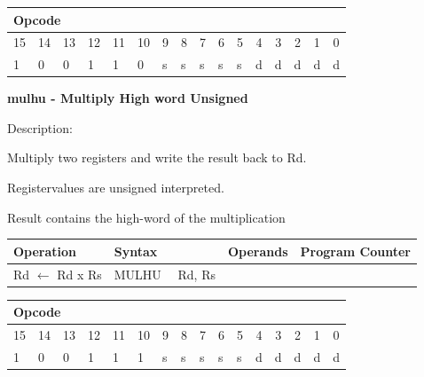 \documentclass[%
	pdftex,
	a4paper,
	oneside,
	bibtotoc,%
	idxtotoc,%
	bibtotocnumbered,
	halfparskip,%
]{scrbook}
\begin{document}
\begin{tabular}{|c|c|c|c|c|c|c|c|c|c|c|c|c|c|c|c|}
\hline
\multicolumn{6}{|l|}{Opcode} & \multicolumn{5}{|l|}{} & \multicolumn{5}{|l|}{
} \\ \hline
15 & 14 & 13 & 12 & 11 & 10 & 9 & 8 & 7 & 6 & 5 & 4 & 3 & 2 & 1 & 0 \\ \hline
\multicolumn{1}{|l|}{1} & \multicolumn{1}{|l|}{0} & \multicolumn{1}{|l|}{0}
& \multicolumn{1}{|l|}{1} & \multicolumn{1}{|l|}{1} & \multicolumn{1}{|l|}{0}
& \multicolumn{1}{|l|}{s} & \multicolumn{1}{|l|}{s} & \multicolumn{1}{|l|}{s}
& \multicolumn{1}{|l|}{s} & \multicolumn{1}{|l|}{s} & \multicolumn{1}{|l|}{d}
& \multicolumn{1}{|l|}{d} & \multicolumn{1}{|l|}{d} & \multicolumn{1}{|l|}{d}
& \multicolumn{1}{|l|}{d} \\ \hline
\end{tabular}

\bigskip

\textbf{mulhu - Multiply High word Unsigned}

Description:

Multiply two registers and write the result back to Rd.

Registervalues are unsigned interpreted.

Result contains the high-word of the multiplication

\begin{tabular}{|l|l|l|l|}
\hline
Operation & Syntax & Operands & Program Counter \\ \hline
Rd $\leftarrow $ Rd x Rs & MULHU \ \ Rd, Rs &  &  \\ \hline
\end{tabular}

\begin{tabular}{|c|c|c|c|c|c|c|c|c|c|c|c|c|c|c|c|}
\hline
\multicolumn{6}{|l|}{Opcode} & \multicolumn{5}{|l|}{} & \multicolumn{5}{|l|}{
} \\ \hline
15 & 14 & 13 & 12 & 11 & 10 & 9 & 8 & 7 & 6 & 5 & 4 & 3 & 2 & 1 & 0 \\ \hline
\multicolumn{1}{|l|}{1} & \multicolumn{1}{|l|}{0} & \multicolumn{1}{|l|}{0}
& \multicolumn{1}{|l|}{1} & \multicolumn{1}{|l|}{1} & \multicolumn{1}{|l|}{1}
& \multicolumn{1}{|l|}{s} & \multicolumn{1}{|l|}{s} & \multicolumn{1}{|l|}{s}
& \multicolumn{1}{|l|}{s} & \multicolumn{1}{|l|}{s} & \multicolumn{1}{|l|}{d}
& \multicolumn{1}{|l|}{d} & \multicolumn{1}{|l|}{d} & \multicolumn{1}{|l|}{d}
& \multicolumn{1}{|l|}{d} \\ \hline
\end{tabular}
\end{document}
